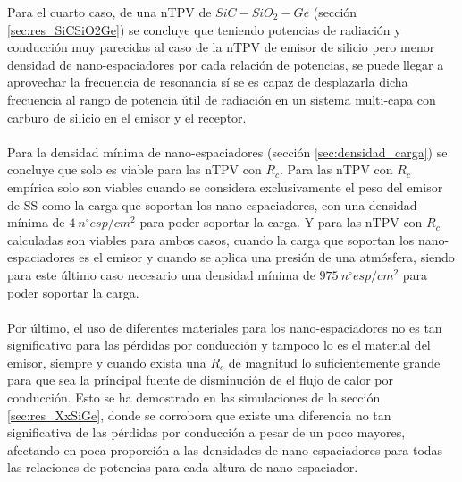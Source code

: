 Para el cuarto caso, de una nTPV de $SiC-SiO_2-Ge$ (sección \ref{sec:res_SiCSiO2Ge}) se concluye que teniendo potencias de radiación y conducción muy parecidas al caso de la nTPV de emisor de silicio pero menor densidad de nano-espaciadores por cada relación de potencias, se puede llegar a aprovechar la frecuencia de resonancia sí se es capaz de desplazarla dicha frecuencia al rango de potencia útil de radiación en un sistema multi-capa con carburo de silicio en el emisor y el receptor.\\\\
Para la densidad mínima de nano-espaciadores (sección \ref{sec:densidad_carga}) se concluye que solo es viable para las nTPV con $R_c$. Para las nTPV con $R_c$ empírica solo son viables cuando se considera exclusivamente el peso del emisor de SS como la carga que soportan los nano-espaciadores, con una densidad mínima de $4 \ n^{\circ}esp/cm^2$ para poder soportar la carga. Y para las nTPV con $R_c$ calculadas son viables para ambos casos, cuando la carga que soportan los nano-espaciadores es el emisor y cuando se aplica una presión de una atmósfera, siendo para este último caso necesario una densidad mínima de $975 \ n^{\circ}esp/cm^2$ para poder soportar la carga.\\\\
Por último, el uso de diferentes materiales para los nano-espaciadores no es tan significativo para las pérdidas por conducción y tampoco lo es el material del emisor, siempre y cuando exista una $R_c$ de magnitud lo suficientemente grande para que sea la principal fuente de disminución de el flujo de calor por conducción. Esto se ha demostrado en las simulaciones de la sección \ref{sec:res_XxSiGe}, donde se corrobora que existe una diferencia no tan significativa de las pérdidas por conducción a pesar de un poco mayores, afectando en poca proporción a las densidades de nano-espaciadores para todas las relaciones de potencias para cada altura de nano-espaciador.
